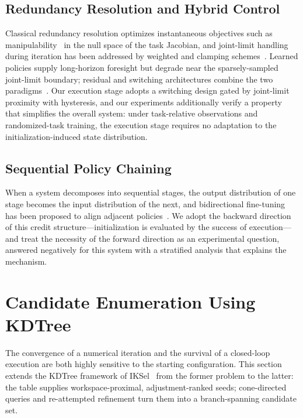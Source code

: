 \documentclass[journal]{IEEEtran}
\begin{document}
\subsection{Redundancy Resolution and Hybrid Control}
Classical redundancy resolution optimizes instantaneous objectives such
as manipulability~\cite{yoshikawa1985manipulability} in the null space
of the task Jacobian, and joint-limit handling during iteration has been
addressed by weighted and clamping
schemes~\cite{huang2016clamping,sekiguchi2021numerical}. Learned
policies supply long-horizon foresight but degrade near the
sparsely-sampled joint-limit boundary; residual and switching
architectures combine the two
paradigms~\cite{johannink2019residual,alshiekh2018safe,kurtz2021control}.
Our execution stage adopts a switching design gated by joint-limit
proximity with hysteresis, and our experiments additionally verify a
property that simplifies the overall system: under task-relative
observations and randomized-task training, the execution stage requires
no adaptation to the initialization-induced state distribution.

\subsection{Sequential Policy Chaining}
When a system decomposes into sequential stages, the output distribution
of one stage becomes the input distribution of the next, and
bidirectional fine-tuning has been proposed to align adjacent
policies~\cite{chen2023sequential}. We adopt the backward direction of
this credit structure---initialization is evaluated by the success of
execution---and treat the necessity of the forward direction as an
experimental question, answered negatively for this system with a
stratified analysis that explains the mechanism.

\section{Candidate Enumeration Using KDTree}
\label{sec:candidate}
The convergence of a numerical iteration and the survival of a
closed-loop execution are both highly sensitive to the starting
configuration. This section extends the KDTree framework of
IKSel~\cite{yuan2026iksel} from the former problem to the latter: the
table supplies workspace-proximal, adjustment-ranked seeds; cone-directed
queries and re-attempted refinement turn them into a branch-spanning
candidate set.
\end{document}
